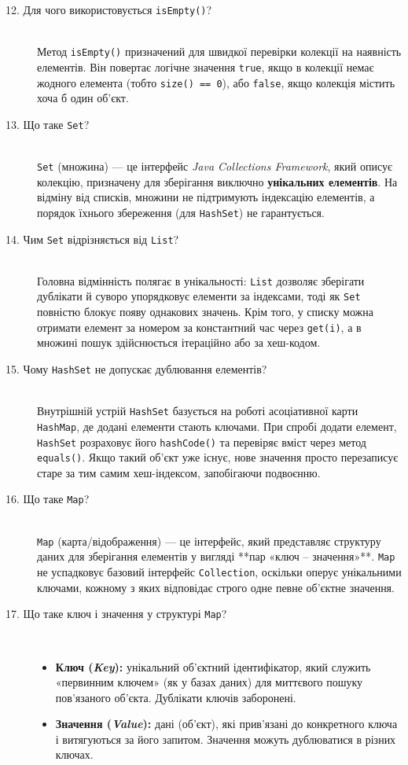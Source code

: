 \begin{description}
    \item[12. Для чого використовується \texttt{isEmpty()}?] ~\\
    Метод \texttt{isEmpty()} призначений для швидкої перевірки колекції на наявність елементів. Він повертає логічне значення \texttt{true}, якщо в колекції немає жодного елемента (тобто \texttt{size() == 0}), або \texttt{false}, якщо колекція містить хоча б один об'єкт.

    \item[13. Що таке \texttt{Set}?] ~\\
    \texttt{Set} (множина) — це інтерфейс \textit{Java Collections Framework}, який описує колекцію, призначену для зберігання виключно \textbf{унікальних елементів}. На відміну від списків, множини не підтримують індексацію елементів, а порядок їхнього збереження (для \texttt{HashSet}) не гарантується.

    \item[14. Чим \texttt{Set} відрізняється від \texttt{List}?] ~\\
    Головна відмінність полягає в унікальності: \texttt{List} дозволяє зберігати дублікати й суворо упорядковує елементи за індексами, тоді як \texttt{Set} повністю блокує появу однакових значень. Крім того, у списку можна отримати елемент за номером за константний час через \texttt{get(i)}, а в множині пошук здійснюється ітераційно або за хеш-кодом.

    \item[15. Чому \texttt{HashSet} не допускає дублювання елементів?] ~\\
    Внутрішній устрій \texttt{HashSet} базується на роботі асоціативної карти \texttt{HashMap}, де додані елементи стають ключами. При спробі додати елемент, \texttt{HashSet} розраховує його \texttt{hashCode()} та перевіряє вміст через метод \texttt{equals()}. Якщо такий об'єкт уже існує, нове значення просто перезаписує старе за тим самим хеш-індексом, запобігаючи подвоєнню.

    \item[16. Що таке \texttt{Map}?] ~\\
    \texttt{Map} (карта/відображення) — це інтерфейс, який представляє структуру даних для зберігання елементів у вигляді **пар «ключ -- значення»**. \texttt{Map} не успадковує базовий інтерфейс \texttt{Collection}, оскільки оперує унікальними ключами, кожному з яких відповідає строго одне певне об'єктне значення.

    \item[17. Що таке ключ і значення у структурі \texttt{Map}?] ~\\
    \begin{itemize}
        \item \textbf{Ключ (\textit{Key}):} унікальний об'єктний ідентифікатор, який служить «первинним ключем» (як у базах даних) для миттєвого пошуку пов'язаного об'єкта. Дублікати ключів заборонені.
        \item \textbf{Значення (\textit{Value}):} дані (об'єкт), які прив'язані до конкретного ключа і витягуються за його запитом. Значення можуть дублюватися в різних ключах.
    \end{itemize}


\end{description}
